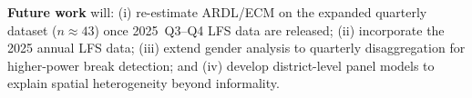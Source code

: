 \documentclass[sigconf]{acmart}
\begin{document}
\textbf{Future work} will: (i) re-estimate ARDL/ECM on the expanded
quarterly dataset ($n{\approx}43$) once 2025~Q3--Q4 LFS data are released;
(ii) incorporate the 2025 annual LFS data; (iii) extend gender analysis to
quarterly disaggregation for higher-power break detection; and (iv) develop
district-level panel models to explain spatial heterogeneity beyond
informality.



\end{document}
